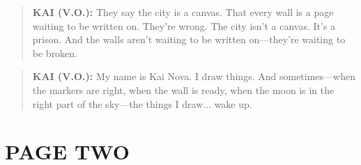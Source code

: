 \documentclass[
    language=english,
    doctype=comic-book,
    institution=none,
]{../../omnilatex}
\begin{document}
\vspace{0.5cm}

\begin{quote}
\textbf{KAI (V.O.):} They say the city is a canvas. That every wall is a page waiting to be written on. They're wrong. The city isn't a canvas. It's a prison. And the walls aren't waiting to be written on---they're waiting to be broken.
\end{quote}

\begin{quote}
\textbf{KAI (V.O.):} My name is Kai Nova. I draw things. And sometimes---when the markers are right, when the wall is ready, when the moon is in the right part of the sky---the things I draw... wake up.
\end{quote}

\chapter{PAGE TWO}
\end{document}
